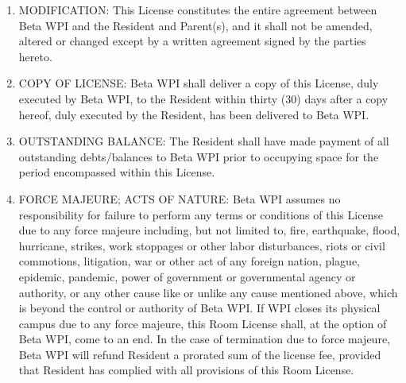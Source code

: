 \documentclass[12pt]{article}
\begin{document}
\begin{enumerate}
\item\label{itm:mods}

MODIFICATION\@: This License constitutes the entire agreement between Beta WPI and the Resident and Parent(s), and it shall not be amended, altered or changed except by a written agreement signed by the parties hereto.

\item\label{itm:copy}

COPY OF LICENSE\@: Beta WPI shall deliver a copy of this License, duly executed by Beta WPI, to the Resident within thirty (30) days after a copy hereof, duly executed by the Resident, has been delivered to Beta WPI\@.

\item\label{itm:balance}

OUTSTANDING BALANCE\@: The Resident shall have made payment of all outstanding debts/balances to Beta WPI prior to occupying space for the period encompassed within this License.

\item\label{itm:forcemajeure}

FORCE MAJEURE; ACTS OF NATURE\@: Beta WPI assumes no responsibility for failure to perform any terms or conditions of this License due to any force majeure including, but not limited to, fire, earthquake, flood, hurricane, strikes, work stoppages or other labor disturbances, riots or civil commotions, litigation, war or other act of any foreign nation, plague, epidemic, pandemic, power of government or governmental agency or authority, or any other cause like or unlike any cause mentioned above, which is beyond the control or authority of Beta WPI\@.
If WPI closes its physical campus due to any force majeure, this Room License shall, at the option of Beta WPI, come to an end.
In the case of termination due to force majeure, Beta WPI will refund Resident a prorated sum of the license fee, provided that Resident has complied with all provisions of this Room License.

\end{enumerate}
\end{document}
